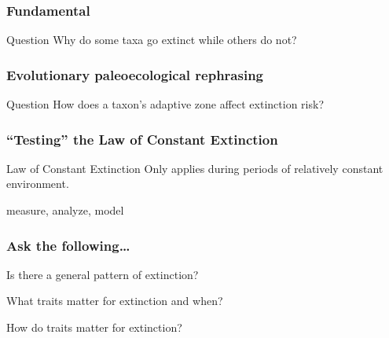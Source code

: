 \documentclass{beamer}
\begin{document}
\begin{frame}
  \frametitle{Fundamental}

  \begin{alertblock}{Question}
    Why do some taxa go extinct while others do not?
  \end{alertblock}
\end{frame}

\begin{frame}
  \frametitle{Evolutionary paleoecological rephrasing}

  \begin{block}{Question}
    How does a taxon's adaptive zone affect extinction risk?
  \end{block}
\end{frame}

\begin{frame}
  \frametitle{``Testing'' the Law of Constant Extinction}

  \begin{block}{Law of Constant Extinction \tiny{}}
    Only applies during periods of relatively \alert{constant} environment.
  \end{block}

  \vspace{1cm}

  \begin{center}
    measure, analyze, model
  \end{center}
\end{frame}

\begin{frame}
  \frametitle{Ask the following\dots}

  \begin{center}
    Is there a \alert{general pattern} of extinction?

    \vspace{0.75cm}

    \alert{What} traits matter for extinction and \alert{when}?

    \vspace{0.75cm}

    \alert{How} do traits matter for extinction?
  \end{center}
\end{frame}
\end{document}
